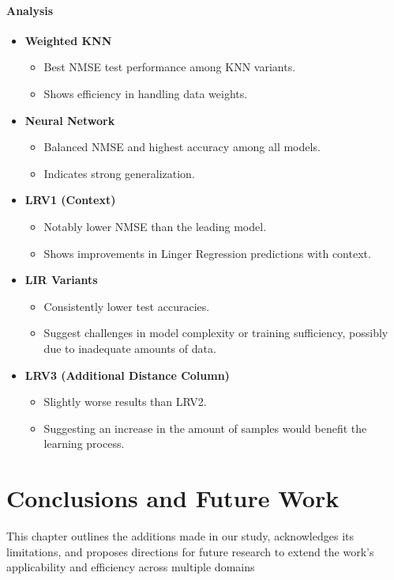 \documentclass[a4paper, 12pt]{report}
\begin{document}
\subsubsection{Analysis}
\begin{itemize}
    \item \textbf{Weighted KNN}
    \begin{itemize}
        \item Best NMSE test performance among KNN variants.
        \item Shows efficiency in handling data weights.
    \end{itemize}
    
    \item \textbf{Neural Network}
    \begin{itemize}
        \item Balanced NMSE and highest accuracy among all models.
        \item Indicates strong generalization.
    \end{itemize}
    
    \item \textbf{LRV1 (Context)}
    \begin{itemize}
        \item Notably lower NMSE than the leading model.
        \item Shows improvements in Linger Regression predictions with context.
    \end{itemize}
    
    \item \textbf{LIR Variants}
    \begin{itemize}
        \item Consistently lower test accuracies.
        \item Suggest challenges in model complexity or training sufficiency, possibly due to inadequate amounts of data.
    \end{itemize}

    \item \textbf{LRV3 (Additional Distance Column)}
    \begin{itemize}
        \item Slightly worse results than LRV2.
        \item Suggesting an increase in the amount of samples would benefit the learning process.
    \end{itemize}
\end{itemize}

\chapter{Conclusions and Future Work}
\label{ch:Conclusions and Future Work}
This chapter outlines the additions made in our study, acknowledges its limitations, and proposes directions for future research to extend 
the work's applicability and efficiency across multiple domains
\end{document}
